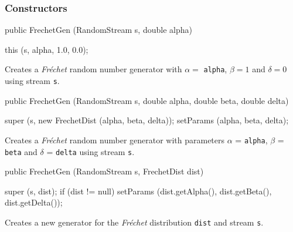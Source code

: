 \subsubsection* {Constructors}
\begin{code}

   public FrechetGen (RandomStream s, double alpha) \begin{hide} {
      this (s, alpha, 1.0, 0.0);
   }\end{hide}
\end{code}
\begin{tabb}  Creates a \emph{Fr\'echet} random number generator with $\alpha =$
 \texttt{alpha}, $\beta = 1$ and $\delta = 0$ using stream \texttt{s}.
\end{tabb}
\begin{code}

   public FrechetGen (RandomStream s, double alpha, double beta,
                      double delta) \begin{hide} {
      super (s, new FrechetDist (alpha, beta, delta));
      setParams (alpha, beta, delta);
   }\end{hide}
\end{code}
\begin{tabb}  Creates a \emph{Fr\'echet} random number generator with parameters
 $\alpha$ = \texttt{alpha}, $\beta$ = \texttt{beta} and $\delta$ = \texttt{delta} using stream \texttt{s}.
\end{tabb}
\begin{code}

   public FrechetGen (RandomStream s, FrechetDist dist) \begin{hide} {
      super (s, dist);
      if (dist != null)
         setParams (dist.getAlpha(), dist.getBeta(), dist.getDelta());
   } \end{hide}
\end{code}
 \begin{tabb}  Creates a new generator for the \emph{Fr\'echet} distribution \texttt{dist}
   and stream \texttt{s}.
 \end{tabb}

